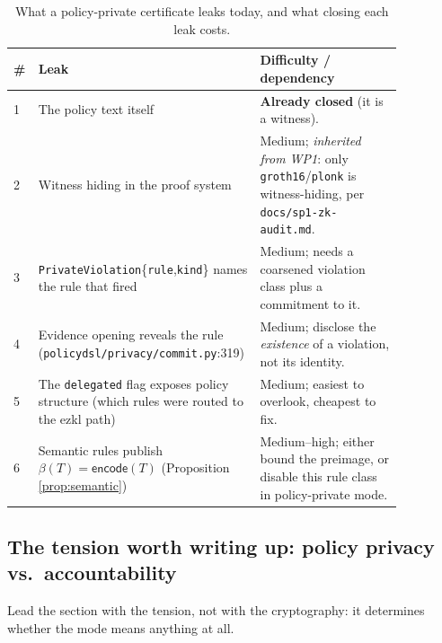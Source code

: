 \documentclass[journal]{IEEEtran}
\newcommand{\need}[1]{}
\newcommand{\need}[1]{\textcolor{blue}{[[ NEED: #1 ]]}}
\begin{document}
\begin{table}[t]
\centering
\caption{What a policy-private certificate leaks today, and what closing each
leak costs.}
\label{tab:wp4}
\begin{tabular}{@{}L{0.04\linewidth}L{0.46\linewidth}L{0.36\linewidth}@{}}
\toprule
\# & Leak & Difficulty / dependency \\
 & The policy text itself & \textbf{Already closed} (it is a witness). \\
2 & Witness hiding in the proof system & Medium; \emph{inherited from WP1}:
    only \texttt{groth16}/\texttt{plonk} is witness-hiding, per
    \texttt{docs/\allowbreak sp1-zk-audit.md}. \\
3 & \texttt{PrivateViolation}\allowbreak\{\texttt{rule},\allowbreak\texttt{kind}\} names the rule that
    fired & Medium; needs a coarsened violation class plus a commitment to it. \\
4 & Evidence opening reveals the rule
    (\texttt{policydsl/\allowbreak privacy/\allowbreak commit.py}:319) & Medium; disclose the
    \emph{existence} of a violation, not its identity. \\
5 & The \texttt{delegated} flag exposes policy structure (which rules were
    routed to the ezkl path) & Medium; easiest to overlook, cheapest to fix. \\
6 & Semantic rules publish $\beta(T)=\mathsf{encode}(T)$
    (Proposition \ref{prop:semantic}) & Medium--high; either bound the
    preimage, or disable this rule class in policy-private mode. \\
\bottomrule
\end{tabular}
\end{table}

\need{Honest structure of the table, and it should be stated as such:
sub-problem 1 is a one-paragraph re-reading of the existing code, \emph{not} a
contribution; 2 is inherited wholesale from WP1; 3--5 are engineering with one
real formal core (disclosure granularity); 6 is where the work is---and it
collides with Theorem \ref{thm:t1}, because one cannot hide the policy while
publishing a lossy encoding of the response that the semantic rules require.}

\subsection{The tension worth writing up: policy privacy vs.\ accountability}
\label{sec:wp4-tension}

Lead the section with the tension, not with the cryptography: it determines
whether the mode means anything at all.
\end{document}
